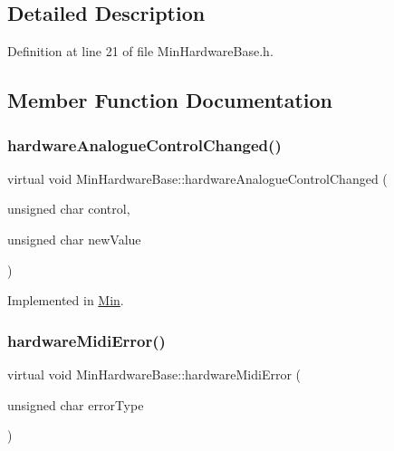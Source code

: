 \subsection{Detailed Description}


Definition at line 21 of file Min\+Hardware\+Base.\+h.



\subsection{Member Function Documentation}
\mbox{\label{class_min_hardware_base_a68f71adaa4f8ed5d170fa09820f63871}} 
\subsubsection{\texorpdfstring{hardware\+Analogue\+Control\+Changed()}{hardwareAnalogueControlChanged()}}
{\footnotesize\ttfamily virtual void Min\+Hardware\+Base\+::hardware\+Analogue\+Control\+Changed (\begin{DoxyParamCaption}\item[{unsigned char}]{control,  }\item[{unsigned char}]{new\+Value }\end{DoxyParamCaption})\hspace{0.3cm}{\ttfamily [pure virtual]}}



Implemented in \hyperlink{class_min_aead3e428133f75538420c1e67c532fa7}{Min}.

\mbox{\label{class_min_hardware_base_ab65fc29881bb7dea6273c0753ad5d7dd}} 
\subsubsection{\texorpdfstring{hardware\+Midi\+Error()}{hardwareMidiError()}}
{\footnotesize\ttfamily virtual void Min\+Hardware\+Base\+::hardware\+Midi\+Error (\begin{DoxyParamCaption}\item[{unsigned char}]{error\+Type }\end{DoxyParamCaption})\hspace{0.3cm}{\ttfamily [pure virtual]}}




